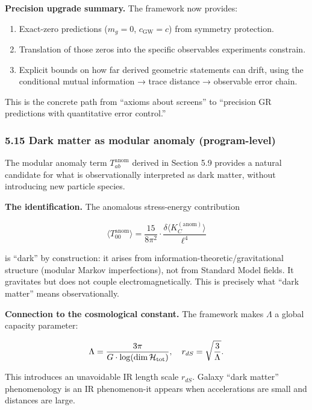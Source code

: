 \documentclass[
]{article}
\providecommand{\tightlist}{%
  \setlength{\itemsep}{0pt}\setlength{\parskip}{0pt}}
\begin{document}
\textbf{Precision upgrade summary.} The framework now provides:

\begin{enumerate}
\def\labelenumi{\arabic{enumi}.}
\tightlist
\item
  Exact-zero predictions (\(m_g = 0\), \(c_{\mathrm{GW}} = c\)) from
  symmetry protection.
\item
  Translation of those zeros into the specific observables experiments
  constrain.
\item
  Explicit bounds on how far derived geometric statements can drift,
  using the conditional mutual information → trace distance → observable
  error chain.
\end{enumerate}

This is the concrete path from ``axioms about screens'' to ``precision
GR predictions with quantitative error control.''

\subsubsection{5.15 Dark matter as modular anomaly
(program-level)}\label{dark-matter-as-modular-anomaly-program-level}

The modular anomaly term \(T_{ab}^{\mathrm{anom}}\) derived in Section
5.9 provides a natural candidate for what is observationally interpreted
as dark matter, without introducing new particle species.

\textbf{The identification.} The anomalous stress-energy contribution

\[
\langle T_{00}^{\mathrm{anom}} \rangle
= \frac{15}{8\pi^2} \cdot \frac{\delta \langle K_C^{\mathrm{(anom)}} \rangle}{\ell^4}
\]

is ``dark'' by construction: it arises from
information-theoretic/gravitational structure (modular Markov
imperfections), not from Standard Model fields. It gravitates but does
not couple electromagnetically. This is precisely what ``dark matter''
means observationally.

\textbf{Connection to the cosmological constant.} The framework makes
\(\Lambda\) a global capacity parameter:

\[
\Lambda = \frac{3\pi}{G \cdot \log(\dim \mathcal{H}_{\rm tot})},
\quad
r_{dS} = \sqrt{\frac{3}{\Lambda}}.
\]

This introduces an unavoidable IR length scale \(r_{dS}\). Galaxy ``dark
matter'' phenomenology is an IR phenomenon-it appears when accelerations
are small and distances are large.
\end{document}
